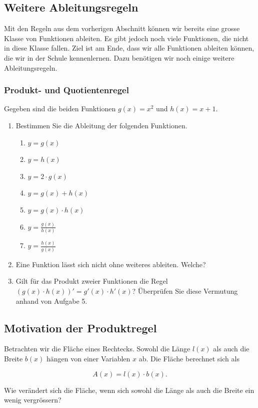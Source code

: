 \subsection{Weitere Ableitungsregeln}
Mit den Regeln aus dem vorherigen Abschnitt können wir bereits eine grosse Klasse von Funktionen ableiten. Es gibt jedoch noch viele Funktionen, die nicht in diese Klasse fallen. Ziel ist am Ende, dass wir alle Funktionen ableiten können, die wir in der Schule kennenlernen. Dazu benötigen wir noch einige weitere Ableitungsregeln.
\subsubsection{Produkt- und Quotientenregel}
Gegeben sind die beiden Funktionen $g(x)=x^2$ und $h(x)=x+1$.
\begin{enumerate}
    \item Bestimmen Sie die Ableitung der folgenden Funktionen.
          \begin{enumerate}
              \item $y=g(x)$
              \item $y=h(x)$
              \item $y=2\cdot g(x)$
              \item $y=g(x)+h(x)$
              \item $y=g(x)\cdot h(x)$
              \item $y=\frac{g(x)}{h(x)}$
              \item $y=\frac{h(x)}{g(x)}$
          \end{enumerate}
    \item Eine Funktion lässt sich nicht ohne weiteres ableiten. Welche?

    \item Gilt für das Produkt zweier Funktionen die Regel $\left(g(x)\cdot h(x)\right)'=g'(x)\cdot h'(x)$? Überprüfen Sie diese Vermutung anhand von Aufgabe 5.
\end{enumerate}
\clearpage
\subsection{Motivation der Produktregel}

Betrachten wir die Fläche eines Rechtecks. Sowohl die Länge \(l(x)\) als auch die Breite \(b(x)\) hängen von einer Variablen \(x\) ab. Die Fläche berechnet sich als

\[
    A(x)=l(x)\cdot b(x).
\]

Wie verändert sich die Fläche, wenn sich sowohl die Länge als auch die Breite ein wenig vergrössern?


